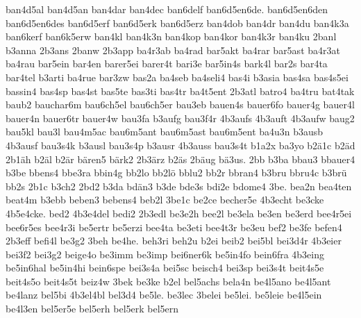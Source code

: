 {    ban4d5al
    ban4d5an
    ban4dar
    ban4dec
    ban6delf
    ban6d5en6de.
    ban6d5en6den
    ban6d5en6des
    ban6d5erf
    ban6d5erk
    ban6d5erz
    ban4dob
    ban4dr
    ban4du
    ban4k3a
    ban6kerf
    ban6k5erw
    ban4kl
    ban4k3n
    ban4kop
    ban4kor
    ban4k3r
    ban4ku
    2banl
    b3anna
    2b3ans
    2banw
    2b3app
    ba4r3ab
    ba4rad
    bar5akt
    ba4rar
    bar5ast
    ba4r3at
    ba4rau
    bar5ein
    bar4en
    barer5ei
    barer4t
    bari3e
    bar5in4s
    bark4l
    bar2s
    bar4ta
    bar4tel
    b3arti
    ba4rue
    bar3zw
    bas2a
    ba4seb
    ba4seli4
    bas4i
    b3asia
    bas4sa
    bas4s5ei
    bassin4
    bas4sp
    bas4st
    bas5te
    bas3ti
    bas4tr
    ba4t5ent
    2b3atl
    batro4
    ba4tru
    bat4tak
    baub2
    bauchar6m
    bau6ch5el
    bau6ch5er
    bau3eb
    bauen4s
    bauer6fo
    bauer4g
    bauer4l
    bauer4n
    bauer6tr
    bauer4w
    bau3fa
    b3aufg
    bau3f4r
    4b3aufs
    4b3auft
    4b3aufw
    baug2
    bau5kl
    bau3l
    bau4m5ac
    bau6m5ant
    bau6m5ast
    bau6m5ent
    ba4u3n
    b3ausb
    4b3ausf
    bau3s4k
    b3ausl
    bau3s4p
    b3ausr
    4b3auss
    bau3s4t
    b1a2x
    ba3yo
    b2ä1c
    b2äd
    2b1äh
    b2äl
    b2är
    bären5
    bärk2
    2b3ärz
    b2äs
    2bäug
    bä3us.
    2bb
    b3ba
    bbau3
    bbauer4
    b3be
    bbens4
    bbe3ra
    bbin4g
    bb2lo
    bb2lö
    bblu2
    bb2r
    bbran4
    b3bru
    bbru4c
    b3brü
    bb2s
    2b1c
    b3ch2
    2bd2
    b3da
    bdän3
    b3de
    bde3s
    bdi2e
    bdome4
    3be.
    bea2n
    bea4ten
    beat4m
    b3ebb
    beben3
    bebens4
    beb2l
    3be1c
    be2ce
    becher5e
    4b3echt
    be3cke
    4b5e4cke.
    bed2
    4b3e4del
    bedi2
    2b3edl
    be3e2h
    bee2l
    be3ela
    be3en
    be3erd
    bee4r5ei
    bee6r5es
    bee4r3i
    be5ertr
    be5erzi
    bee4ta
    be3eti
    bee4t3r
    be3eu
    bef2
    be3fe
    befen4
    2b3eff
    befi4l
    be3g2
    3beh
    be4he.
    beh3ri
    beh2u
    b2ei
    beib2
    bei5bl
    bei3d4r
    4b3eier
    bei3f2
    bei3g2
    beige4o
    be3imm
    be3imp
    bei6ner6k
    be5in4fo
    bein6fra
    4b3eing
    be5in6hal
    be5in4hi
    bein6spe
    bei3s4a
    bei5sc
    beisch4
    bei3sp
    bei3s4t
    beit4s5e
    beit4s5o
    beit4s5t
    beiz4w
    3bek
    be3ke
    b2el
    bel5achs
    bela4n
    be4l5ano
    be4l5ant
    be4lanz
    bel5bi
    4b3el4bl
    bel3d4
    be5le.
    be3lec
    3belei
    be5lei.
    be5leie
    be4l5ein
    be4l3en
    bel5er5e
    bel5erh
    bel5erk
    bel5ern
}
